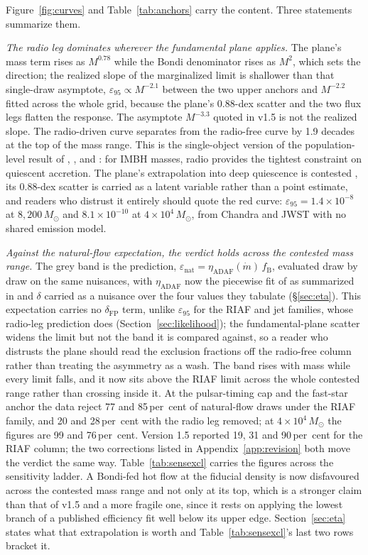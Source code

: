 \documentclass[11pt]{article}
\newcommand{\msun}{\ensuremath{M_\odot}}
\newcommand{\epsl}{\ensuremath{\varepsilon_{95}}}
\begin{document}
Figure~\ref{fig:curves} and Table~\ref{tab:anchors} carry the content. Three statements summarize them.

\emph{The radio leg dominates wherever the fundamental plane applies.} The plane's mass term rises as $M^{0.78}$ while the Bondi denominator rises as $M^{2}$, which sets the direction; the realized slope of the marginalized limit is shallower than that single-draw asymptote, $\epsl \propto M^{-2.1}$ between the two upper anchors and $M^{-2.2}$ fitted across the whole grid, because the plane's 0.88-dex scatter and the two flux legs flatten the response. The asymptote $M^{-3.3}$ quoted in v1.5 is not the realized slope. The radio-driven curve separates from the radio-free curve by 1.9 decades at the top of the mass range. This is the single-object version of the population-level result of \citet{Maccarone2005}, \citet{Strader2012}, and \citet{Tremou2018}: for IMBH masses, radio provides the tightest constraint on quiescent accretion. The plane's extrapolation into deep quiescence is contested \citep{Plotkin2012}, its 0.88-dex scatter is carried as a latent variable rather than a point estimate, and readers who distrust it entirely should quote the red curve: $\epsl = 1.4\times10^{-8}$ at $8{,}200\,\msun$ and $8.1\times10^{-10}$ at $4\times10^{4}\,\msun$, from Chandra and JWST with no shared emission model.

\emph{Against the natural-flow expectation, the verdict holds across the contested mass range.} The grey band is the prediction, $\varepsilon_{\mathrm{nat}} = \eta_{\mathrm{ADAF}}(\dot{m})\,f_{\mathrm{B}}$, evaluated draw by draw on the same nuisances, with $\eta_{\mathrm{ADAF}}$ now the piecewise fit of \citet{XieYuan2012} as summarized in \citet{YuanNarayan2014} and $\delta$ carried as a nuisance over the four values they tabulate (\S\ref{sec:eta}). This expectation carries no $\delta_{\mathrm{FP}}$ term, unlike \epsl{} for the RIAF and jet families, whose radio-leg prediction does (Section~\ref{sec:likelihood}); the fundamental-plane scatter widens the limit but not the band it is compared against, so a reader who distrusts the plane should read the exclusion fractions off the radio-free column rather than treating the asymmetry as a wash. The band rises with mass while every limit falls, and it now sits above the RIAF limit across the whole contested range rather than crossing inside it. At the pulsar-timing cap and the fast-star anchor the data reject 77 and 85\,per~cent of natural-flow draws under the RIAF family, and 20 and 28\,per~cent with the radio leg removed; at $4\times10^{4}\,\msun$ the figures are 99 and 76\,per~cent. Version 1.5 reported 19, 31 and 90\,per~cent for the RIAF column; the two corrections listed in Appendix~\ref{app:revision} both move the verdict the same way. Table~\ref{tab:sensexcl} carries the figures across the sensitivity ladder. A Bondi-fed hot flow at the fiducial density is now disfavoured across the contested mass range and not only at its top, which is a stronger claim than that of v1.5 and a more fragile one, since it rests on applying the lowest branch of a published efficiency fit well below its upper edge. Section~\ref{sec:eta} states what that extrapolation is worth and Table~\ref{tab:sensexcl}'s last two rows bracket it.
\end{document}
